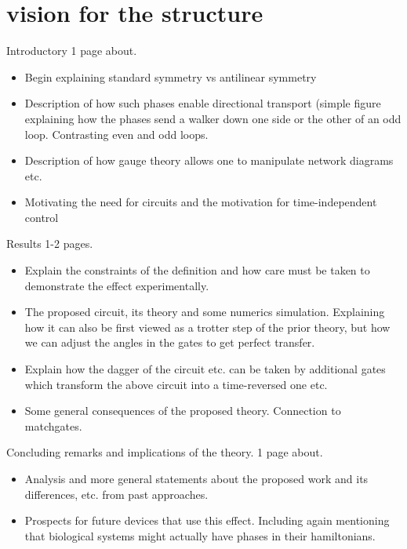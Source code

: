 \documentclass[aps,pra,12pt,nofootinbib,superscriptaddress,longbibliography,showpacs]{revtex4-1}
\theoremstyle{plain}
\theoremstyle{definition}
\begin{document}
\section{vision for the structure} 

Introductory 1 page about. 
\begin{itemize}
 \item Begin explaining standard symmetry vs antilinear symmetry 
 
 \item Description of how such phases enable directional transport (simple figure explaining how the phases send a walker down one side or the other of an odd loop.  Contrasting even and odd loops. 
 
 \item Description of how gauge theory allows one to manipulate network diagrams etc. 
 
 \item Motivating the need for circuits and the motivation for time-independent control 
 
\end{itemize}

Results 1-2 pages. 

\begin{itemize}
 \item Explain the constraints of the definition and how care must be taken to demonstrate the effect experimentally.  
 
 \item The proposed circuit, its theory and some numerics simulation.  Explaining how it can also be first viewed as a trotter step of the prior theory, but how we can adjust the angles in the gates to get perfect transfer.  
 
 \item Explain how the dagger of the circuit etc. can be taken by additional gates which transform the above circuit into a time-reversed one etc. 
 
 \item Some general consequences of the proposed theory.  Connection to matchgates.  
 
\end{itemize}

Concluding remarks and implications of the theory.  1 page about.  

\begin{itemize}
 \item  Analysis and more general statements about the proposed work and its differences, etc. from past approaches. 
 
 \item Prospects for future devices that use this effect.  Including again mentioning that biological systems might actually have phases in their hamiltonians. 
 
\end{itemize}
\end{document}
